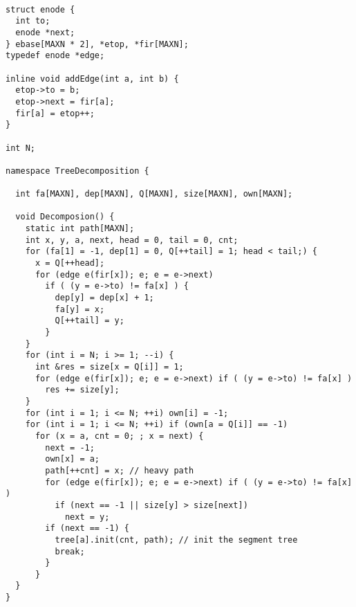\begin{lstlisting}

struct enode {
  int to;
  enode *next;
} ebase[MAXN * 2], *etop, *fir[MAXN];
typedef enode *edge;

inline void addEdge(int a, int b) {
  etop->to = b;
  etop->next = fir[a];
  fir[a] = etop++;
}

int N;

namespace TreeDecomposition {

  int fa[MAXN], dep[MAXN], Q[MAXN], size[MAXN], own[MAXN];

  void Decomposion() {
    static int path[MAXN];
    int x, y, a, next, head = 0, tail = 0, cnt;
    for (fa[1] = -1, dep[1] = 0, Q[++tail] = 1; head < tail;) {
      x = Q[++head];
      for (edge e(fir[x]); e; e = e->next)
        if ( (y = e->to) != fa[x] ) {
          dep[y] = dep[x] + 1;
          fa[y] = x;
          Q[++tail] = y;
        }
    }
    for (int i = N; i >= 1; --i) {
      int &res = size[x = Q[i]] = 1;
      for (edge e(fir[x]); e; e = e->next) if ( (y = e->to) != fa[x] )
        res += size[y];
    }
    for (int i = 1; i <= N; ++i) own[i] = -1;
    for (int i = 1; i <= N; ++i) if (own[a = Q[i]] == -1)
      for (x = a, cnt = 0; ; x = next) {
        next = -1;
        own[x] = a;
        path[++cnt] = x; // heavy path
        for (edge e(fir[x]); e; e = e->next) if ( (y = e->to) != fa[x] )
          if (next == -1 || size[y] > size[next])
            next = y;
        if (next == -1) {
          tree[a].init(cnt, path); // init the segment tree
          break;
        }
      }
  }
}

\end{lstlisting}